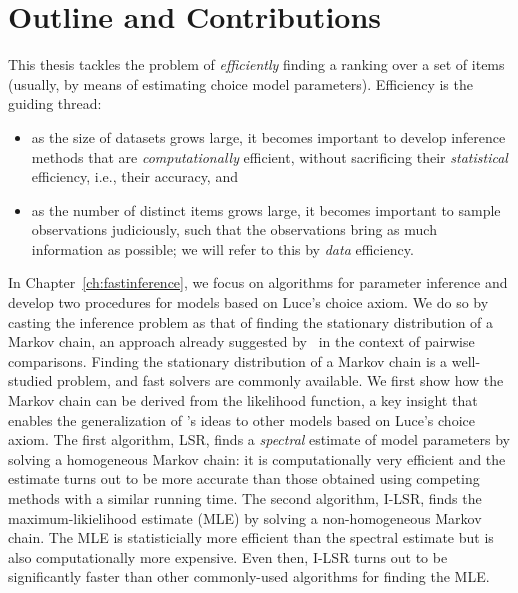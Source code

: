 \section{Outline and Contributions}
\label{in:sec:outline}

This thesis tackles the problem of \emph{efficiently} finding a ranking over a set of items (usually, by means of estimating choice model parameters).
Efficiency is the guiding thread:
\begin{itemize}
\item as the size of datasets grows large, it becomes important to develop inference methods that are \emph{computationally} efficient, without sacrificing their \emph{statistical} efficiency, i.e., their accuracy, and
\item as the number of distinct items grows large, it becomes important to sample observations judiciously, such that the observations bring as much information as possible; we will refer to this by \emph{data} efficiency.
\end{itemize}

In Chapter~\ref{ch:fastinference}, we focus on algorithms for parameter inference and develop two procedures for models based on Luce's choice axiom.
We do so by casting the inference problem as that of finding the stationary distribution of a Markov chain, an approach already suggested by~\citet{negahban2012iterative} in the context of pairwise comparisons.
Finding the stationary distribution of a Markov chain is a well-studied problem, and fast solvers are commonly available.
We first show how the Markov chain can be derived from the likelihood function, a key insight that enables the generalization of \citeauthor{negahban2012iterative}'s ideas to other models based on Luce's choice axiom.
The first algorithm, LSR, finds a \emph{spectral} estimate of model parameters by solving a homogeneous Markov chain: it is computationally very efficient and the estimate turns out to be more accurate than those obtained using competing methods with a similar running time.
The second algorithm, I-LSR, finds the maximum-likielihood estimate (MLE) by solving a non-homogeneous Markov chain.
The MLE is statisticially more efficient than the spectral estimate but is also computationally more expensive.
Even then, I-LSR turns out to be significantly faster than other commonly-used algorithms for finding the MLE.

